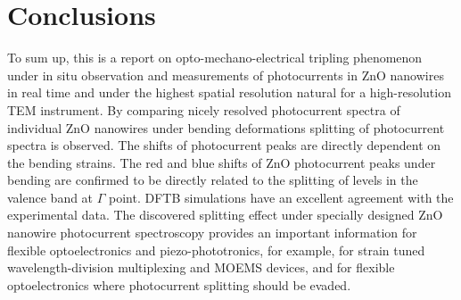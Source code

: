 \section{Conclusions}
To sum up, this is a report on opto-mechano-electrical tripling phenomenon under in situ observation and measurements of photocurrents in ZnO nanowires in real time and under the highest spatial resolution natural for a high-resolution TEM instrument. By comparing nicely resolved photocurrent spectra of individual ZnO nanowires under bending deformations splitting of photocurrent spectra is observed. The shifts of photocurrent peaks are directly dependent on the bending strains. The red and blue shifts of ZnO photocurrent peaks under bending are confirmed to be directly related to the splitting of levels in the valence band at $\Gamma$ point. DFTB simulations have an excellent agreement with the experimental data. The discovered splitting effect under specially designed ZnO nanowire photocurrent spectroscopy provides an important information for flexible optoelectronics and piezo-phototronics, for example, for strain tuned wavelength-division multiplexing and MOEMS devices, and for flexible optoelectronics where photocurrent splitting should be evaded. 



